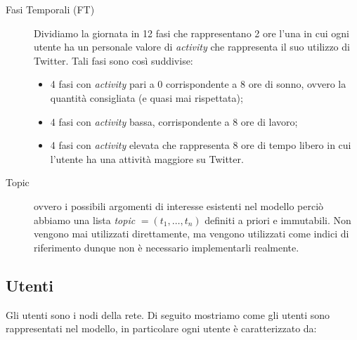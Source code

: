 \documentclass[a4paper,12pt]{article}
\begin{document}
\begin{description}
  \item[Fasi Temporali (FT)] Dividiamo la giornata in 12 fasi che 
    rappresentano 2 ore l'una in cui ogni utente ha un personale
    valore di \textit{activity} che rappresenta il suo utilizzo di Twitter.
    Tali fasi sono cos\`i suddivise:
    \begin{itemize}
      \item 4 fasi con \textit{activity} pari a 0 corrispondente a 8
      ore di sonno, ovvero la quantit\`a consigliata (e quasi mai 
      rispettata);
      \item 4 fasi con \textit{activity} bassa, corrispondente a 8 ore di 
      lavoro;
      \item 4 fasi con \textit{activity} elevata che rappresenta 8 ore di 
      tempo libero in cui l'utente ha una attivit\`a maggiore su 
      Twitter.
    \end{itemize} 

  \item[Topic] ovvero i possibili argomenti di interesse esistenti 
    nel modello perci\`o abbiamo una lista \textit{topic} 
    $ = (t_1, \dots , t_n) $ definiti a priori e immutabili. 
    Non vengono mai utilizzati direttamente, ma vengono utilizzati 
    come indici di riferimento dunque non \`e necessario 
    implementarli realmente.
\end{description}

\subsection{Utenti}
\label{subsec:users}
Gli utenti sono i nodi della rete. Di seguito mostriamo come gli utenti sono rappresentati nel modello, in particolare ogni utente \`e caratterizzato da:
\end{document}
